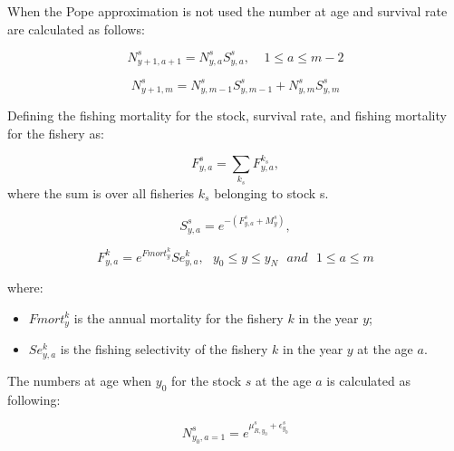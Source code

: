 \documentclass{article}
\begin{document}
When the Pope approximation is not used the number at age and survival rate are calculated as follows:

\begin{equation}
N^s_{y+1,a+1}=N^s_{y,a}S^s_{y,a}, \ \ \ \ \ 1\leq a \leq m-2
\end{equation}

\begin{equation}
N^s_{y+1,m}=N^s_{y,m-1}S^s_{y,m-1}+N^s_{y,m}S^s_{y,m}
\end{equation}

Defining the fishing mortality for the stock, survival rate, and fishing mortality for the fishery as:

\begin{equation}
F^s_{y,a} = \sum_{k_s}F^{k_s}_{y,a}, 
\end{equation}
where the sum is over all fisheries $k_s$ belonging to stock s.

\begin{equation}
S^s_{y,a}=e^{-(F^s_{y,a}+M^{s}_{y})},
\end{equation}

\begin{equation}
F^k_{y,a}=e^{Fmort^k_y}Se^k_{y,a}, \ \ \ y_0\leq y \leq y_N \ \ \ and  \ \ \  1\leq a \leq m
\end{equation}

where:
\begin{itemize}

    
    \item $Fmort^k_y$ is the annual mortality for the fishery $k$ in the year $y$;
    \item $Se^k_{y,a}$ is the fishing selectivity of the fishery $k$ in the year $y$ at the age $a$.

\end{itemize}

\hfill

The numbers at age when $y_0$ for the stock $s$ at the age $a$ is calculated as following:

\begin{equation}
N^s_{y_0,a=1}=e^{\mu^s_{R,y_0} + \epsilon^s_{y_0}}
\end{equation}
\end{document}
